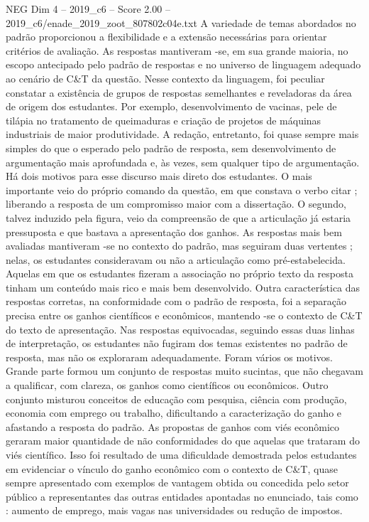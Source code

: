 \begin{textsample}{NEG Dim 4 – 2019\_c6 – Score 2.00 – 2019\_c6/enade\_2019\_zoot\_807802c04e.txt}
A variedade de temas abordados no padrão proporcionou a flexibilidade e a extensão necessárias para orientar critérios de avaliação.
As respostas mantiveram -se, em sua grande maioria, no escopo antecipado pelo padrão de respostas e no universo de linguagem adequado ao cenário de C\&T da questão.
Nesse contexto da linguagem, foi peculiar constatar a existência de grupos de respostas semelhantes e reveladoras da área de origem dos estudantes.
Por exemplo, desenvolvimento de vacinas, pele de tilápia no tratamento de queimaduras e criação de projetos de máquinas industriais de maior produtividade.
A redação, entretanto, foi quase sempre mais simples do que o esperado pelo padrão de resposta, sem desenvolvimento de argumentação mais aprofundada e, às vezes, sem qualquer tipo de argumentação.
Há dois motivos para esse discurso mais direto dos estudantes.
O mais importante veio do próprio comando da questão, em que constava o verbo citar ; liberando a resposta de um compromisso maior com a dissertação.
O segundo, talvez induzido pela figura, veio da compreensão de que a articulação já estaria pressuposta e que bastava a apresentação dos ganhos.
As respostas mais bem avaliadas mantiveram -se no contexto do padrão, mas seguiram duas vertentes ; nelas, os estudantes consideravam ou não a articulação como pré-estabelecida.
Aquelas em que os estudantes fizeram a associação no próprio texto da resposta tinham um conteúdo mais rico e mais bem desenvolvido.
Outra característica das respostas corretas, na conformidade com o padrão de resposta, foi a separação precisa entre os ganhos científicos e econômicos, mantendo -se o contexto de C\&T do texto de apresentação.
Nas respostas equivocadas, seguindo essas duas linhas de interpretação, os estudantes não fugiram dos temas existentes no padrão de resposta, mas não os exploraram adequadamente.
Foram vários os motivos.
Grande parte formou um conjunto de respostas muito sucintas, que não chegavam a qualificar, com clareza, os ganhos como científicos ou econômicos.
Outro conjunto misturou conceitos de educação com pesquisa, ciência com produção, economia com emprego ou trabalho, dificultando a caracterização do ganho e afastando a resposta do padrão.
As propostas de ganhos com viés econômico geraram maior quantidade de não conformidades do que aquelas que trataram do viés científico.
Isso foi resultado de uma dificuldade demostrada pelos estudantes em evidenciar o vínculo do ganho econômico com o contexto de C\&T, quase sempre apresentado com exemplos de vantagem obtida ou concedida pelo setor público a representantes das outras entidades apontadas no enunciado, tais como : aumento de emprego, mais vagas nas universidades ou redução de impostos.

\end{textsample}
